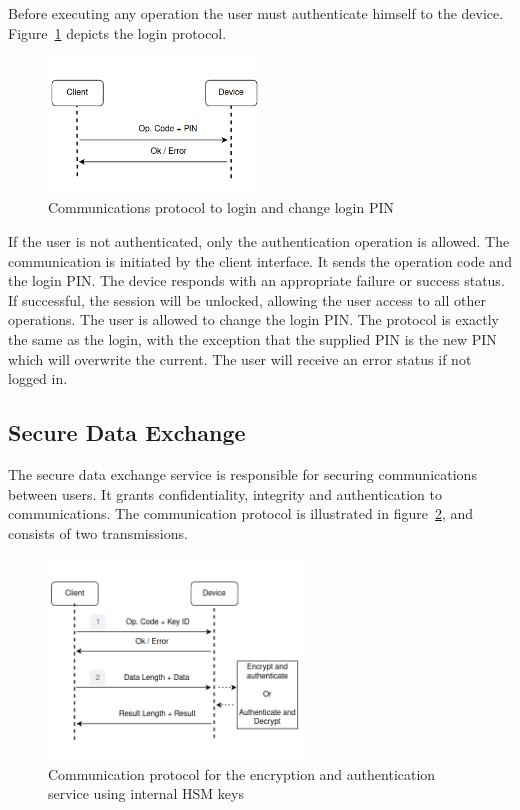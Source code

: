Before executing any operation the user must authenticate himself to the device.
Figure~\ref{fig:protocol:login} depicts the login protocol.

\begin{figure}[h!]
	\centering
	\includegraphics[width=0.50\textwidth]{./Images/authentication.png}
	\caption{Communications protocol to login and change login PIN}
	\label{fig:protocol:login}
\end{figure}

If the user is not authenticated, only the authentication operation is allowed. The communication is initiated by the client interface. It sends the operation code and the login \ac{PIN}.
The device responds with an appropriate failure or success status. If successful, the session will be unlocked, allowing the user access to all other operations.
The user is allowed to change the login \ac{PIN}. The protocol is exactly the same as the login, with the exception that the supplied \ac{PIN} is the new \ac{PIN} which will overwrite the current. The user will receive an error status if not logged in.

\subsection{Secure Data Exchange}\label{chap:arch:services:data-exchange}

The secure data exchange service is responsible for securing communications between users. It grants confidentiality, integrity and authentication to communications.
The communication protocol is illustrated in figure~\ref{fig:protocol:data-exchange}, and consists of two transmissions.
\begin{figure}[h!]
	\centering
	\includegraphics[width=0.60\textwidth]{./Images/data-exchange.png}
	\caption{Communication protocol for the encryption and authentication service using internal HSM keys}
	\label{fig:protocol:data-exchange}
\end{figure}


